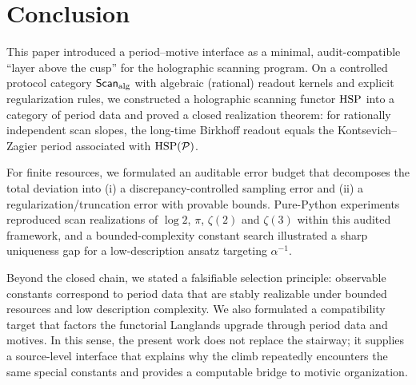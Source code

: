 
\section{Conclusion}
\label{sec:conclusion}

This paper introduced a period--motive interface as a minimal, audit-compatible ``layer above the cusp'' for the holographic scanning program. On a controlled protocol category $\mathsf{Scan}_{\mathrm{alg}}$ with algebraic (rational) readout kernels and explicit regularization rules, we constructed a holographic scanning functor $\mathrm{HSP}$ into a category of period data and proved a closed realization theorem: for rationally independent scan slopes, the long-time Birkhoff readout equals the Kontsevich--Zagier period associated with $\mathrm{HSP}(\mathcal{P})$.

For finite resources, we formulated an auditable error budget that decomposes the total deviation into (i) a discrepancy-controlled sampling error and (ii) a regularization/truncation error with provable bounds. Pure-Python experiments reproduced scan realizations of $\log 2$, $\pi$, $\zeta(2)$ and $\zeta(3)$ within this audited framework, and a bounded-complexity constant search illustrated a sharp uniqueness gap for a low-description ansatz targeting $\alpha^{-1}$.

Beyond the closed chain, we stated a falsifiable selection principle: observable constants correspond to period data that are stably realizable under bounded resources and low description complexity. We also formulated a compatibility target that factors the functorial Langlands upgrade through period data and motives. In this sense, the present work does not replace the stairway; it supplies a source-level interface that explains why the climb repeatedly encounters the same special constants and provides a computable bridge to motivic organization.


